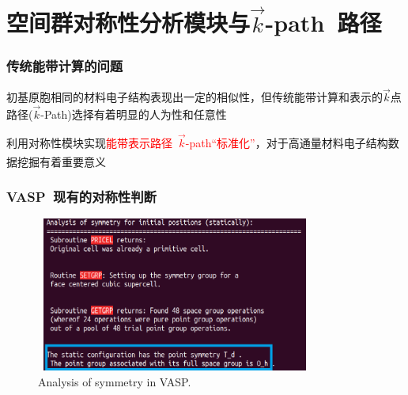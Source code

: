 \documentclass[cjk,slidestop,handout,compress,mathserif,blue]{beamer}	%
\newcommand{\upcite}[1]{\hspace{0ex}\textsuperscript{\cite{#1}}} %
\begin{document}
\section{空间群对称性分析模块与$\vec k$-\rm{path~}路径}
\frame
{
	\frametitle{传统能带计算的问题}
	初基原胞相同的材料电子结构表现出一定的相似性，但传统能带计算和表示的$\vec k$点路径($\vec k$-\textrm{Path})选择有着明显的人为性和任意性
\begin{figure}[h!]
\centering
\hspace*{-0.30in}
\label{Band_Gap_BCC_GeF4}
\end{figure}
利用对称性模块实现\textcolor{red}{能带表示路径~$\vec k$-\textrm{path}“标准化”}，对于高通量材料电子结构数据挖掘有着重要意义\upcite{CMS49-299_2010}
}

\frame
{
	\frametitle{\textrm{VASP~}现有的对称性判断}
\begin{figure}[h!]
\centering
\hspace*{-0.28in}
\includegraphics[height=2.0in,width=3.6in,viewport=0 0 600 380,clip]{Figures/VASP_Symmetry.png}
\caption{\textrm{Analysis of symmetry in VASP.}}
\label{VASP_symmetry}
\end{figure}
}
\end{document}
